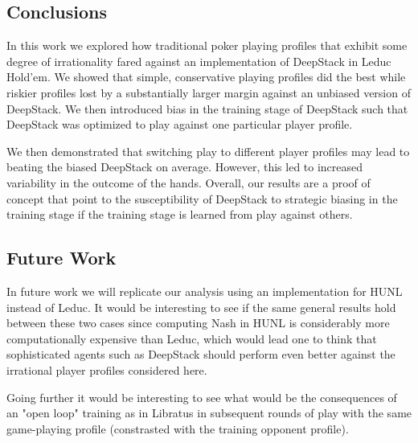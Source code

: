 \documentclass{article}
\begin{document}
\subsection{Conclusions}

In this work we explored how traditional poker playing profiles that exhibit some degree of irrationality fared against an implementation of DeepStack in Leduc Hold'em. We showed that simple, conservative playing profiles did the best while riskier profiles lost by a substantially larger margin against an unbiased version of DeepStack. We then introduced bias in the training stage of DeepStack such that DeepStack was optimized to play against one particular player profile. 

\indent We then demonstrated that switching play to different player profiles may lead to beating the biased DeepStack on average. However, this led to increased variability in the outcome of the hands. Overall, our results are a proof of concept that point to the susceptibility of DeepStack to strategic biasing in the training stage if the training stage is learned from play against others. 

\subsection{Future Work}
In future work we will replicate our analysis using an implementation for HUNL instead of Leduc. It would be interesting to see if the same general results hold between these two cases since computing Nash in HUNL is considerably more computationally expensive than Leduc, which would lead one to think that sophisticated agents such as DeepStack should perform even better against the irrational player profiles considered here. 

\indent Going further it would be interesting to see what would be the consequences of an "open loop" training as in Libratus in subsequent rounds of play with the same game-playing profile (constrasted with the training opponent profile). %



\end{document}
